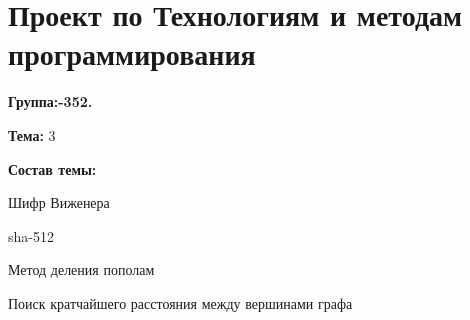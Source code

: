 \chapter{Проект по Технологиям и методам программирования }
\hypertarget{md__r_e_a_d_m_e}{}\label{md__r_e_a_d_m_e}
\label{md__r_e_a_d_m_e_autotoc_md0}%
%


{\bfseries{Группа:-\/352.}}

{\bfseries{Тема:\+}} 3

{\bfseries{Состав темы:\+}}

Шифр Виженера

sha-\/512

Метод деления пополам

Поиск кратчайшего расстояния между вершинами графа 